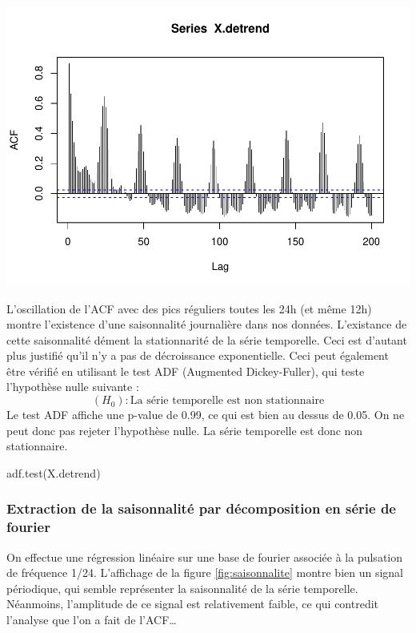 \documentclass[
]{article}
\newenvironment{Shaded}{\begin{snugshade}}{\end{snugshade}}
\newcommand{\FunctionTok}[1]{\textcolor[rgb]{0.00,0.00,0.00}{#1}}
\newcommand{\NormalTok}[1]{#1}
\begin{document}
\includegraphics{STA202_report_files/figure-latex/unnamed-chunk-19-1.pdf}

L'oscillation de l'ACF avec des pics réguliers toutes les 24h (et même
12h) montre l'existence d'une saisonnalité journalière dans nos données.
L'existance de cette saisonnalité dément la stationnarité de la série
temporelle. Ceci est d'autant plus justifié qu'il n'y a pas de
décroissance exponentielle. Ceci peut également être vérifié en
utilisant le test ADF (Augmented Dickey-Fuller), qui teste l'hypothèse
nulle suivante :
\[(H_0): \text{La série temporelle est non stationnaire}\] Le test ADF
affiche une p-value de 0.99, ce qui est bien au dessus de 0.05. On ne
peut donc pas rejeter l'hypothèse nulle. La série temporelle est donc
non stationnaire.

\begin{Shaded}
\begin{Highlighting}[]
\FunctionTok{adf.test}\NormalTok{(X.detrend)}
\end{Highlighting}
\end{Shaded}

\hypertarget{extraction-de-la-saisonnalituxe9-par-duxe9composition-en-suxe9rie-de-fourier}{%
\subsubsection{Extraction de la saisonnalité par décomposition en série
de
fourier}\label{extraction-de-la-saisonnalituxe9-par-duxe9composition-en-suxe9rie-de-fourier}}

On effectue une régression linéaire sur une base de fourier associée à
la pulsation de fréquence 1/24. L'affichage de la figure
\ref{fig:saisonnalite} montre bien un signal périodique, qui semble
représenter la saisonnalité de la série temporelle. Néanmoins,
l'amplitude de ce signal est relativement faible, ce qui contredit
l'analyse que l'on a fait de l'ACF\ldots{}
\end{document}

